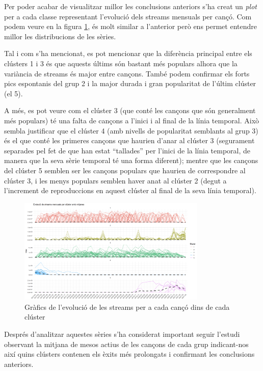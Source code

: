 Per poder acabar de visualitzar millor les conclusions anteriors s'ha creat un \textit{plot} per a cada classe representant l'evolució dels streams mensuals per cançó. Com podem veure en la figura \ref{fig:ts_clust_streams_month_cluster}, és molt similar a l'anterior però ens permet entendre millor les distribucions de les sèries. 

Tal i com s'ha mencionat, es pot mencionar que la diferència principal entre els clústers 1 i 3 és que aquests últims són bastant més populars alhora que la variància de streams és major entre cançons. També podem confirmar els forts pics espontanis del grup 2 i la major durada i gran popularitat de l'últim clúster (el 5).

A més, es pot veure com el clúster 3 (que conté les cançons que són generalment més populars) té una falta de cançons a l'inici i al final de la línia temporal. Això sembla justificar que el clúster 4 (amb nivells de popularitat semblants al grup 3) és el que conté les primeres cançons que haurien d'anar al clúster 3 (segurament separades pel fet de que han estat ``tallades'' per l'inici de la línia temporal, de manera que la seva sèrie temporal té una forma diferent); mentre que les cançons del clúster 5 semblen ser les cançons populars que haurien de correspondre al clúster 3, i les menys populars semblen haver anat al clúster 2 (degut a l'increment de reproduccions en aquest clúster al final de la seva línia temporal).

\begin{figure}[H]
    \centering
    \includegraphics[width=0.8\textwidth]{Images/4_clustering/time_series/streams_cada_mes_per_cluster_amb_mitjana.png}
    \caption{Gràfics de l'evolució de les streams per a cada cançó dins de cada clúster}
    \label{fig:ts_clust_streams_month_cluster}
\end{figure}

Després d'analitzar aquestes sèries s'ha considerat important seguir l'estudi observant la mitjana de mesos actius de les cançons de cada grup indicant-nos així quins clústers contenen els èxits més prolongats i confirmant les conclusions anteriors.

